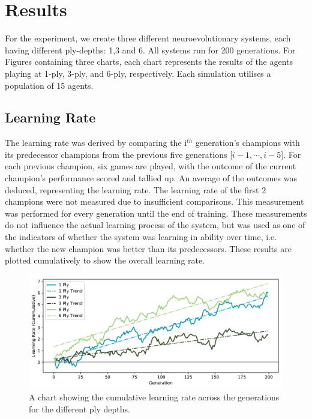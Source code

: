\documentclass[12pt,a4paper]{article}
\begin{document}
\section{Results}
    

    For the experiment, we create three different neuroevolutionary systems, each having different ply-depths: 1,3 and 6. All systems run for 200 generations. For Figures containing three charts, each chart represents the results of the agents playing at 1-ply, 3-ply, and 6-ply, respectively. Each simulation utilises a population of 15 agents.

    \subsection{Learning Rate}
    
    The learning rate was derived by comparing the i$^{th}$ generation's champions with its predecessor champions from the previous five generations [$i-1, \cdots, i-5$]. For each previous champion, six games are played, with the outcome of the current champion's performance scored and tallied up. An average of the outcomes was deduced, representing the learning rate. The learning rate of the first 2 champions were not measured due to insufficient comparisons. This measurement was performed for every generation until the end of training. These measurements do not influence the actual learning process of the system, but was used as one of the indicators of whether the system was learning in ability over time, i.e. whether the new champion was better than its predecessors. These results are plotted cumulatively to show the overall learning rate.
    
    \begin{figure}[!ht]
        \centering
        \includegraphics[width=140mm]{images/results/combined_cummulative.pdf}
        \caption{A chart showing the cumulative learning rate across the generations for the different ply depths.\label{cum_growth}}
    \end{figure}
    
\end{document}
